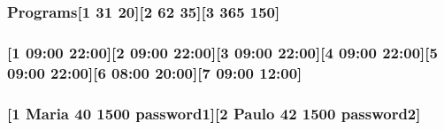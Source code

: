 \subsubsection[{\texorpdfstring{Programs}{Programs}}]{\setlength{\rightskip}{0pt plus 5cm}Programs\mbox{[}1 31 20\mbox{]}\mbox{[}2 62 35\mbox{]}\mbox{[}3 365 150\mbox{]}}\hypertarget{outFile_8txt_a079e4f76d2da3f02f43dfd6e67359bf7}{}\label{outFile_8txt_a079e4f76d2da3f02f43dfd6e67359bf7}
\subsubsection[{\texorpdfstring{Schedule}{Schedule}}]{\mbox{[}1 09\+:00 22\+:00\mbox{]}\mbox{[}2 09\+:00 22\+:00\mbox{]}\mbox{[}3 09\+:00 22\+:00\mbox{]}\mbox{[}4 09\+:00 22\+:00\mbox{]}\mbox{[}5 09\+:00 22\+:00\mbox{]}\mbox{[}6 08\+:00 20\+:00\mbox{]}\mbox{[}7 09\+:00 12\+:00\mbox{]}}\hypertarget{outFile_8txt_a061a3989efe937642aa9d1dc75313167}{}\label{outFile_8txt_a061a3989efe937642aa9d1dc75313167}
\subsubsection[{\texorpdfstring{Staff}{Staff}}]{\mbox{[}1 Maria 40 1500 password1\mbox{]}\mbox{[}2 Paulo 42 1500 password2\mbox{]}}\hypertarget{outFile_8txt_ace2bec253417dd04567d51f2f7a892f0}{}\label{outFile_8txt_ace2bec253417dd04567d51f2f7a892f0}
